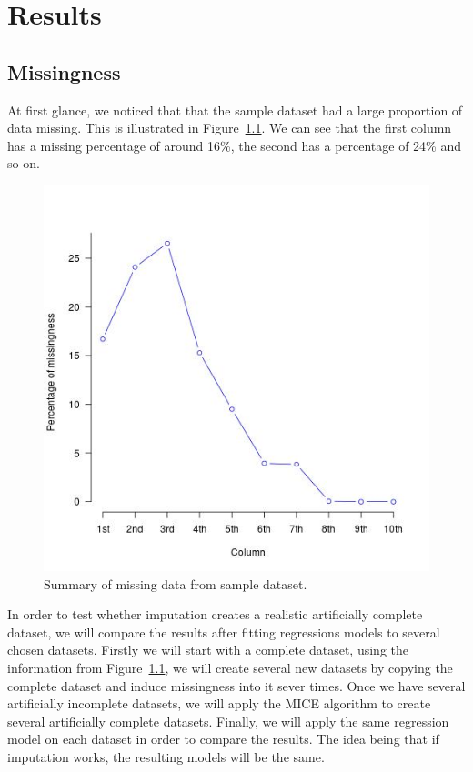 \documentclass[bsc]{abdnthesis}
\begin{document}

\chapter{Results}
\section{Missingness} %
\label{sec:missingness}
At first glance, we noticed that that the sample dataset had a large proportion of data missing. This is illustrated in Figure~\ref{missing-data}. We can see that the first column has a missing percentage of around 16\%, the second has a percentage of 24\% and so on. 
\begin{figure}[h]
  \centering
    \includegraphics[width=0.85 \textwidth]{eqmiss}
  \caption{Summary of missing data from sample dataset.}
  \label{missing-data}
\end{figure}

In order to test whether imputation creates a realistic artificially complete dataset, we will compare the results after fitting regressions models to several chosen datasets. Firstly we will start with a complete dataset, using the information from Figure~\ref{missing-data}, we will create several new datasets by copying the complete dataset and induce missingness into it sever times. Once we have several artificially incomplete datasets, we will apply the MICE algorithm to create several artificially complete datasets. Finally, we will apply the same regression model on each dataset in order to compare the results. The idea being that if imputation works, the resulting models will be the same. 
\end{document}
